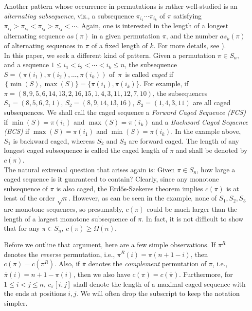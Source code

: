 \documentclass[11pt, a4paper]{article}
\theoremstyle{compact}
\begin{document}
Another pattern whose occurrence in permutations is rather well-studied is an \textit{alternating subsequence}, viz., a subsequence $\pi_{i_1}\cdots \pi_{i_k}$ of $\pi$  satisfying $\pi_{i_1}>\pi_{i_2}<\pi_{i_3}>\pi_{i_4}<\cdots$. Again, one is interested in the length of a longest alternating sequence $as(\pi)$ in a given permutation $\pi$, and the number $as_k(\pi)$ of alternating sequences in $\pi$ of a fixed length of $k$. For more details, see \cite{Stan}).   \\

In this paper, we seek a different kind of pattern. Given a permutation $\pi\in S_n$, and a sequence $1\le i_1<i_2<\cdots<i_k\le n$, the subsequence $S = (\pi(i_1), \pi(i_2), \dots, \pi(i_k) )$ of $\, \pi\,$ is called \emph{caged} if $\, \{ \min(S), \max(S)\} = \{ \pi(i_1), \pi(i_k) \}$. For example, if $\pi=(8,9,5,6,14,13,2,16,15,1,4,3,11,12,7,10)$, the subsequences $S_1=(8,5,6,2,1)$, $S_2=(8,9,14,13,16)$, $S_3=(1,4,3,11)$ are all caged subsequences. We shall call the caged sequence a \emph{Forward Caged Sequence (FCS)} if $\min(S)=\pi(i_1)$ and $\max(S)=\pi(i_k)$ and a \emph{Backward Caged Sequence (BCS)} if $\max(S)=\pi(i_1)$ and $\min(S)=\pi(i_k)$. In the example above, $S_1$ is backward caged, whereas $S_2$ and $S_3$ are forward caged. The length of any longest caged subsequence is called the caged length of $\pi$ and shall be denoted by $c(\pi)$.\\

The natural extremal question that arises again is: Given $\pi\in S_n$, how large a caged sequence is it guaranteed to contain? Clearly, since any monotone subsequence of $\pi$ is also caged, the Erd\H{o}s-Szekeres theorem implies $c(\pi)$ is at least of the order $\sqrt{n}$. However, as can be seen in the example, none of $S_1,S_2,S_3$ are monotone sequences, so presumably, $c(\pi)$ could be much larger than the length of a largest monotone subsequence of $\pi$. In fact, it is not difficult to show that for any $\pi\in S_n$, $c(\pi)\ge\Omega(n)$. 

Before we outline that argument, here are a few simple observations. If $\pi^R$ denotes the \emph{reverse} permutation, i.e., $\pi^R(i)=\pi(n+1-i)$, then $c(\pi)=c(\pi^R)$.  Also, if $\overline{\pi}$ denotes the \emph{complement} permutation of $\pi$, i.e., $\overline{\pi}(i)=n+1-\pi(i)$, then we also have $c(\pi)=c(\overline{\pi})$. Furthermore, for $1\le i<j\le n$, $c_{\pi}[i,j]$ shall denote the length of a maximal caged sequence with the ends at positions $i,j$. We will often drop the subscript to keep the notation simpler.\\
\end{document}
